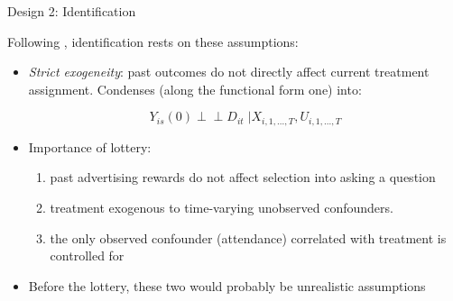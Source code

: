 \documentclass[10pt,aspectratio=169]{beamer}
\newcommand{\ind}{\perp\!\!\!\!\perp}
\begin{document}
\begin{frame}{Design 2: Identification}

\small

Following \citet{LiuEtAl}, identification rests on these assumptions:

\begin{itemize}\setlength\itemsep{0.65em}
    \item \emph{Strict exogeneity}: past outcomes do not directly affect current treatment assignment. Condenses (along the functional form one) into:

    $$Y_{is}(0) \ind D_{it} \; | X_{i,1,...,T}, U_{i, 1, ..., T}$$
    \medskip
    \item \alert{Importance of lottery:} 
    \begin{enumerate}\setlength\itemsep{0.65em}
        \item past advertising rewards do not affect selection into asking a question
        \item treatment exogenous to time-varying unobserved confounders. 
        \item the only observed confounder (attendance) correlated with treatment is controlled for
        
    \end{enumerate}
    \medskip
    
    \item Before the lottery, these two would probably be unrealistic assumptions

\end{itemize}

\medskip


\end{frame}
\end{document}
